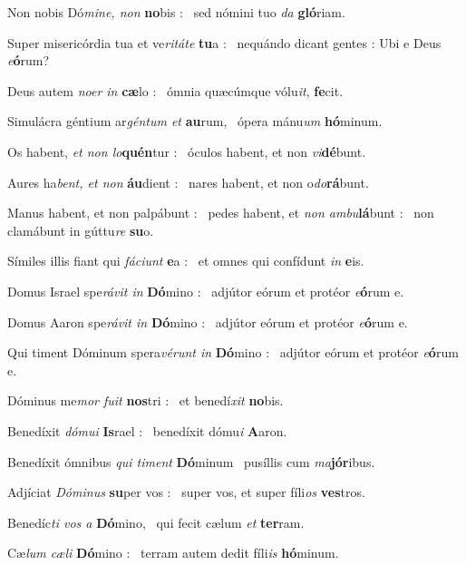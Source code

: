 \documentclass[12pt]{article} %
\newenvironment{psalmtext}{\leftskip 0.25in}{\vspace{2 mm}}
\let\oldgresixstar\gresixstar
\renewcommand{\gresixstar}{\textcolor{benred8}{\oldgresixstar}}
\let\oldgredagger\gredagger
\renewcommand{\gredagger}{\textcolor{benred8}{\oldgredagger}}
\begin{document}
\begin{pages}
\begin{Leftside}
\begin{psalmtext}
Non nobis Dó\emph{mine, non} \textbf{no}bis : \gresixstar\ sed nómini tuo \emph{da} \textbf{gló}riam.

Super misericórdia tua et ve\emph{ritáte} \textbf{tu}a : \gresixstar\ nequándo dicant gentes : Ubi e Deus \emph{e}\textbf{ó}rum?

Deus autem \emph{noer in} \textbf{cæ}lo : \gresixstar\ ómnia quæcúmque vólu\emph{it}, \textbf{fe}cit.

Simulácra géntium ar\emph{géntum et} \textbf{au}rum, \gresixstar\ ópera mánu\emph{um} \textbf{hó}minum.

Os habent, \emph{et non lo}\textbf{quén}tur : \gresixstar\ óculos habent, et non \emph{vi}\textbf{dé}bunt.

Aures ha\emph{bent, et non} \textbf{áu}dient : \gresixstar\ nares habent, et non o\emph{do}\textbf{rá}bunt.

Manus habent, et non palpábunt : \gredagger\ pedes habent, et \emph{non ambu}\textbf{lá}bunt : \gresixstar\ non clamábunt in gúttu\emph{re} \textbf{su}o.

Símiles illis fiant qui \emph{fáciunt} \textbf{e}a : \gresixstar\ et omnes qui confídunt \emph{in} \textbf{e}is.

Domus Israel spe\emph{rávit in} \textbf{Dó}mino : \gresixstar\ adjútor eórum et protéor \emph{e}\textbf{ó}rum e.

Domus Aaron spe\emph{rávit in} \textbf{Dó}mino : \gresixstar\ adjútor eórum et protéor \emph{e}\textbf{ó}rum e.

Qui timent Dóminum spera\emph{vérunt in} \textbf{Dó}mino : \gresixstar\ adjútor eórum et protéor \emph{e}\textbf{ó}rum e.

Dóminus me\emph{mor fuit} \textbf{nos}tri : \gresixstar\ et benedí\emph{xit} \textbf{no}bis.

Benedíxit \emph{dómui} \textbf{Is}rael : \gresixstar\ benedíxit dómu\emph{i} \textbf{A}aron.

Benedíxit ómnibus \emph{qui timent} \textbf{Dó}minum \gresixstar\ pusíllis cum \emph{ma}\textbf{jór}ibus.

Adjíciat \emph{Dóminus} \textbf{su}per vos : \gresixstar\ super vos, et super fíli\emph{os} \textbf{ves}tros.

Benedíc\emph{ti vos a} \textbf{Dó}mino, \gresixstar\ qui fecit cælum \emph{et} \textbf{ter}ram.

Cæ\emph{lum cæli} \textbf{Dó}mino : \gresixstar\ terram autem dedit fíli\emph{is} \textbf{hó}minum.


\end{psalmtext}
\end{Leftside}
\end{pages}
\end{document}
